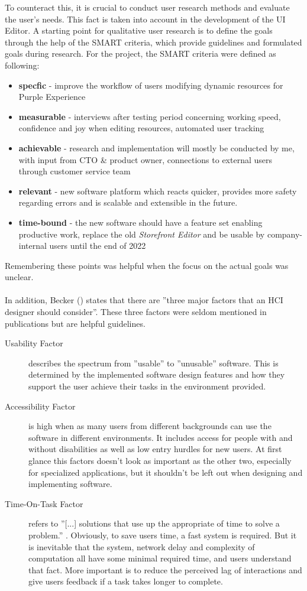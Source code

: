 To counteract this, it is crucial to conduct user research methods and evaluate the user's needs.
This fact is taken into account in the development of the UI Editor.
A starting point for qualitative user research is to define the goals through the help of the SMART criteria, which provide guidelines and formulated goals during research.
For the project, the SMART criteria were defined as following:
\label{fig:smart}
\begin{itemize}
  \item \textbf{specfic} - improve the workflow of users modifying dynamic resources for Purple Experience
  \item \textbf{measurable} - interviews after testing period concerning working speed, confidence and joy when editing resources, automated user tracking
  \item \textbf{achievable} - research and implementation will mostly be conducted by me, with input from CTO \& product owner, connections to external users through customer service team
  \item \textbf{relevant} - new software platform which reacts quicker, provides more safety regarding errors and is scalable and extensible in the future.
  \item \textbf{time-bound} - the new software should have a feature set enabling productive work, replace the old \textit{Storefront Editor} and be usable by company-internal users until the end of 2022
\end{itemize}
Remembering these points was helpful when the focus on the actual goals was unclear.
\\\\
In addition, Becker (\cite[pp. 37-41]{LearnHCI:2020ys}) states that there are ''three major factors that an HCI designer should consider''.
These three factors were seldom mentioned in publications but are helpful guidelines.
\begin{description}
  \item[Usability Factor] describes the spectrum from ''usable'' to ''unusable'' software. This is determined by the implemented software design features and how they support the user achieve their tasks in the environment provided.
  \item[Accessibility Factor] is high when as many users from different backgrounds can use the software in different environments. 
  It includes access for people with and without disabilities as well as low entry hurdles for new users.
  At first glance this factors doesn't look as important as the other two, especially for specialized applications, but it shouldn't be left out when designing and implementing software.
  \item[Time-On-Task Factor] refers to ''[...] solutions that use up the appropriate of time to solve a problem.'' \Cite[p. 40]{LearnHCI:2020ys}. Obviously, to save users time, a fast system is required.
But it is inevitable that the system, network delay and complexity of computation all have some minimal required time, and users understand that fact. More important is to reduce the perceived lag of interactions and give users feedback if a task takes longer to complete.
\end{description}

